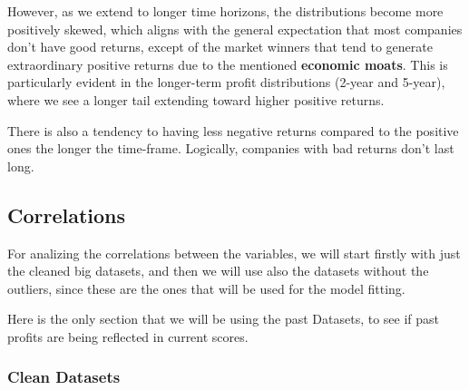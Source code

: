 \documentclass[11pt,english,a4paper,hidelinks]{book}
\begin{document}
\vspace{0.5cm}
\noindent However, as we extend to longer time horizons, the distributions become more positively skewed, which aligns with the general expectation that most companies don't have good returns, except of the market winners that tend to generate extraordinary positive returns due to the mentioned \textbf{economic moats}. This is particularly evident in the longer-term profit distributions (2-year and 5-year), where we see a longer tail extending toward higher positive returns.


\vspace{0.5cm}
\noindent There is also a tendency to having less negative returns compared to the positive ones the longer the time-frame. Logically, companies with bad returns don't last long.

\subsection{Correlations}

For analizing the correlations between the variables, we will start firstly with just the cleaned big datasets, and then we will use also the datasets without the outliers, since these are the ones that will be used for the model fitting.

\vspace{0.5cm}
\noindent Here is the only section that we will be using the past Datasets, to see if past profits are being reflected in current scores.
\subsubsection{Clean Datasets}
\end{document}
